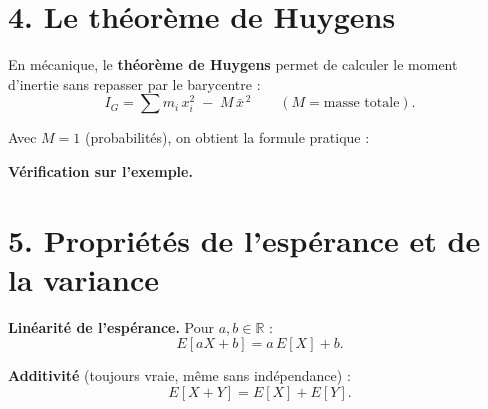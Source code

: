 
\section*{4. Le théorème de Huygens}

En mécanique, le \textbf{théorème de Huygens}
permet de calculer le moment d'inertie
sans repasser par le barycentre :
\[
  I_G = \sum m_i \, x_i^2 \;-\; M\,\bar{x}^{\,2}
  \qquad (M = \text{masse totale}).
\]

Avec $M = 1$ (probabilités), on obtient la formule pratique :


\textbf{Vérification sur l'exemple.}


\section*{5. Propriétés de l'espérance et de la variance}

\textbf{Linéarité de l'espérance.}
Pour $a,b \in \mathbb{R}$ :
\[
  E[aX+b] = a\,E[X] + b.
\]

\textbf{Additivité}
(toujours vraie, même sans indépendance) :
\[
  E[X+Y] = E[X] + E[Y].
\]

